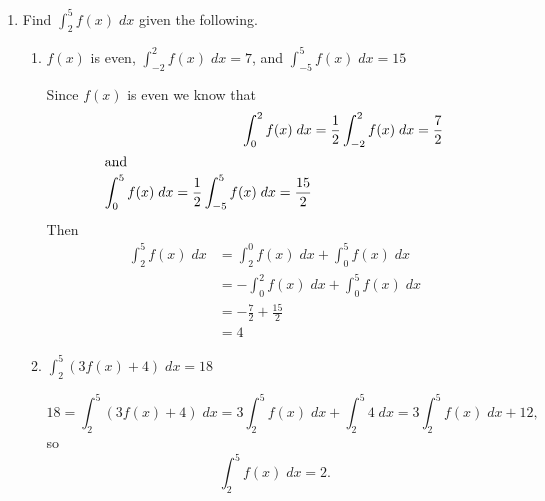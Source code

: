 \documentclass[11pt]{article}
\begin{document}
\begin{enumerate}
  \vfill

\item Find $\int_2^5 f(x)\;dx$ given the following.
  \begin{enumerate}
  \item $f(x)$ is even, $\int_{-2}^2 f(x)\;dx=7$, and $\int_{-5}^5 f(x)\;dx=15$

    \vfill

    Since $f(x)$ is even we know that
    \begin{align*}
      \int_0^2 f(x)\;dx &= \frac{1}{2}\int_{-2}^2 f(x)\;dx = \frac{7}{2}\\
      \intertext{and}
      \int_0^5 f(x)\;dx = \frac{1}{2}\int_{-5}^5 f(x)\;dx = \frac{15}{2}\\
    \end{align*}
    Then
    \begin{align*}
      \int_2^5 f(x)\;dx &= \int_2^0 f(x)\; dx +\int_0^5 f(x)\; dx\\
      &= -\int_0^2 f(x)\; dx +\int_0^5 f(x)\; dx\\
      &= -\frac{7}{2}+\frac{15}{2}\\
      &= 4
    \end{align*}
    
    \vfill

  \item $\int_2^5 (3f(x)+4)\;dx = 18$

    \vfill

    \[
    18=\int_2^5 (3f(x)+4)\;dx=3\int_2^5 f(x)\;dx+\int_2^5
    4\;dx=3\int_2^5 f(x)\;dx+12,
    \]
    so
    \[
    \int_2^5 f(x)\;dx = 2.
    \]
    
    \vfill
  \end{enumerate}
  
\end{enumerate}
\end{document}
